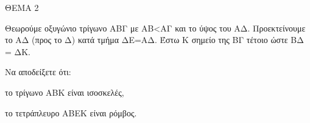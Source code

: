 
ΘΕΜΑ 2

Θεωρούμε οξυγώνιο τρίγωνο ΑΒΓ με ΑΒ\textless ΑΓ και το ύψος του ΑΔ. Προεκτείνουμε το ΑΔ (προς το Δ) κατά τμήμα ΔΕ=ΑΔ. Έστω Κ σημείο της ΒΓ τέτοιο ώστε ΒΔ = ΔΚ.

Να αποδείξετε ότι:

\begin{alist}
\item το τρίγωνο ΑΒΚ είναι ισοσκελές, 

\item το τετράπλευρο ΑΒΕΚ είναι ρόμβος. 
\end{alist}

